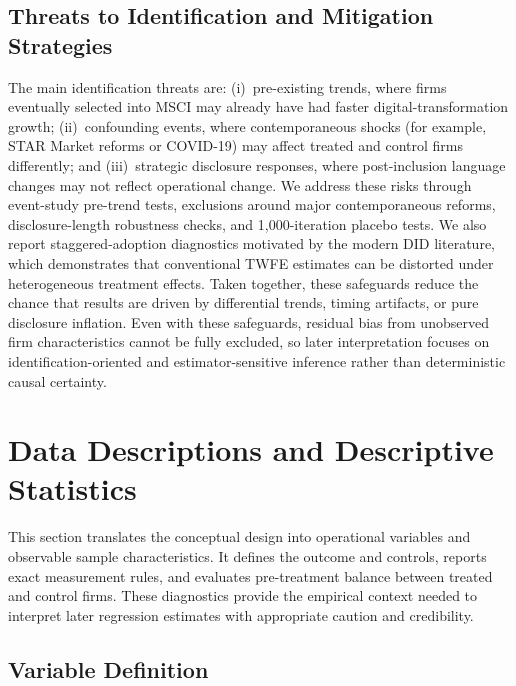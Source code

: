 \subsection{Threats to Identification and Mitigation Strategies}
\label{sec:threats}

The main identification threats are: (i)~pre-existing trends, where firms eventually selected into MSCI may already have had faster digital-transformation growth; (ii)~confounding events, where contemporaneous shocks (for example, STAR Market reforms or COVID-19) may affect treated and control firms differently; and (iii)~strategic disclosure responses, where post-inclusion language changes may not reflect operational change. We address these risks through event-study pre-trend tests, exclusions around major contemporaneous reforms, disclosure-length robustness checks, and 1,000-iteration placebo tests. We also report staggered-adoption diagnostics motivated by the modern DID literature, which demonstrates that conventional TWFE estimates can be distorted under heterogeneous treatment effects. Taken together, these safeguards reduce the chance that results are driven by differential trends, timing artifacts, or pure disclosure inflation.
Even with these safeguards, residual bias from unobserved firm characteristics cannot be fully excluded, so later interpretation focuses on identification-oriented and estimator-sensitive inference rather than deterministic causal certainty.

\section{Data Descriptions and Descriptive Statistics}

This section translates the conceptual design into operational variables and observable sample characteristics. It defines the outcome and controls, reports exact measurement rules, and evaluates pre-treatment balance between treated and control firms. These diagnostics provide the empirical context needed to interpret later regression estimates with appropriate caution and credibility.

\subsection{Variable Definition}

